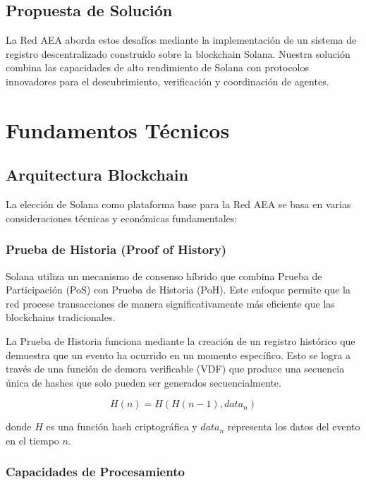 \documentclass[12pt,a4paper]{article}
\begin{document}
\subsection{Propuesta de Solución}

La Red AEA aborda estos desafíos mediante la implementación de un sistema de registro descentralizado construido sobre la blockchain Solana. Nuestra solución combina las capacidades de alto rendimiento de Solana con protocolos innovadores para el descubrimiento, verificación y coordinación de agentes.

\section{Fundamentos Técnicos}

\subsection{Arquitectura Blockchain}

La elección de Solana como plataforma base para la Red AEA se basa en varias consideraciones técnicas y económicas fundamentales:

\subsubsection{Prueba de Historia (Proof of History)}

Solana utiliza un mecanismo de consenso híbrido que combina Prueba de Participación (PoS) con Prueba de Historia (PoH). Este enfoque permite que la red procese transacciones de manera significativamente más eficiente que las blockchains tradicionales.

La Prueba de Historia funciona mediante la creación de un registro histórico que demuestra que un evento ha ocurrido en un momento específico. Esto se logra a través de una función de demora verificable (VDF) que produce una secuencia única de hashes que solo pueden ser generados secuencialmente.

\begin{equation}
H(n) = H(H(n-1), data_n)
\end{equation}

donde $H$ es una función hash criptográfica y $data_n$ representa los datos del evento en el tiempo $n$.

\subsubsection{Capacidades de Procesamiento}
\end{document}
